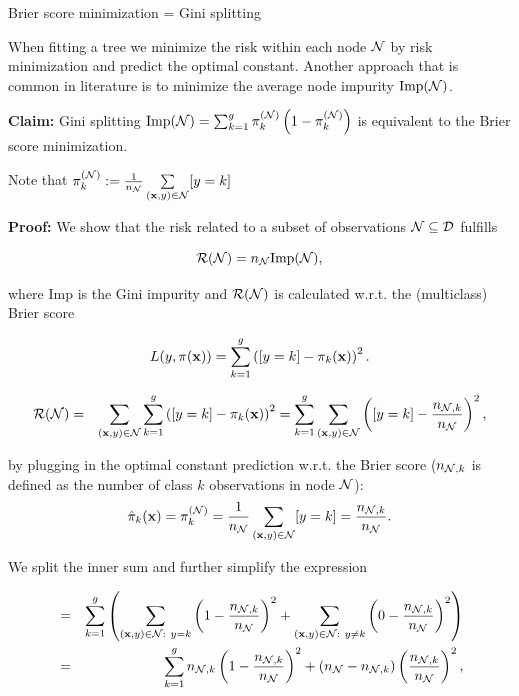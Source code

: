 \documentclass[11pt,compress,t,notes=noshow, xcolor=table]{beamer}
\begin{document}
\begin{vbframe}{Brier score minimization = Gini splitting}

When fitting a tree we minimize the risk within each node $\mathcal{N}$ by risk minimization and predict the optimal constant. Another approach that is common in literature is to minimize the average node impurity $\text{Imp}(\mathcal{N})$. 

\vspace*{0.2cm}

\textbf{Claim:} Gini splitting $\text{Imp}(\mathcal{N}) = \sum_{k=1}^g \pi_k^{(\mathcal{N})} \left(1-\pi_k^{(\mathcal{N})} \right)$ is equivalent to the Brier score minimization. 

\begin{footnotesize}
Note that $\pi_k^{(\mathcal{N})} := \frac{1}{n_{\mathcal{N}}} \sum\limits_{(\mathbf{x},y) \in \mathcal{N}} [y = k]$ 
\end{footnotesize}

\vspace*{0.2cm}

\begin{footnotesize}

\textbf{Proof: } We show that the risk related to a subset of observations $\mathcal{N} \subseteq \mathcal{D}$ fulfills 


$$
  \mathcal{R}(\mathcal{N}) = n_{\mathcal{N}} \text{Imp}(\mathcal{N}),
$$
  
  where $\text{Imp}$ is the Gini impurity and $\mathcal{R}(\mathcal{N})$ is calculated w.r.t. the (multiclass) Brier score


$$
  L(y, \pi(\mathbf{x})) = \sum_{k = 1}^g \left([y = k] - \pi_k(\mathbf{x})\right)^2.
$$

\framebreak

\vspace*{-0.5cm}
\begin{eqnarray*}
\mathcal{R}(\mathcal{N}) &=& \sum_{(\mathbf{x}, y) \in \mathcal{N}}  \sum_{k = 1}^g \left([y = k] - \pi_k(\mathbf{x})\right)^2 
= \sum_{k = 1}^g \sum_{(\mathbf{x}, y) \in \mathcal{N}} \left([y = k] - \frac{n_{\mathcal{N},k}}{n_{\mathcal{N} }}\right)^2,
\end{eqnarray*}

by plugging in the optimal constant prediction w.r.t. the Brier score ($n_{\mathcal{N},k}$ is defined as the number of class $k$ observations in node $\mathcal{N}$): 
$$\hat \pi_k(\mathbf{x})= \pi_k^{(\mathcal{N})} = \frac{1}{n_{\mathcal{N}}} \sum\limits_{(\mathbf{x},y) \in \mathcal{N}} [y = k] = \frac{n_{\mathcal{N},k}}{n_{\mathcal{N} }}. $$ 

 We split the inner sum and further simplify the expression

\begin{eqnarray*}
&=& \sum_{k = 1}^{g} \left(\sum_{(\mathbf{x}, y) \in \mathcal{N}: ~ y = k} \left(1 - \frac{n_{\mathcal{N},k}}{n_{\mathcal{N} }}\right)^2 + \sum_{(\mathbf{x}, y) \in \mathcal{N}: ~ y \ne k} \left(0 - \frac{n_{\mathcal{N},k}}{n_{\mathcal{N} }}\right)^2\right) \\
&=& \sum_{k = 1}^g n_{\mathcal{N},k}\left(1 - \frac{n_{\mathcal{N},k}}{n_{\mathcal{N} }}\right)^2 + (n_{\mathcal{N} } - n_{\mathcal{N},k})\left(\frac{n_{\mathcal{N},k}}{n_{\mathcal{N} }}\right)^2, 
\end{eqnarray*}


\end{footnotesize}
\end{vbframe}
\end{document}

